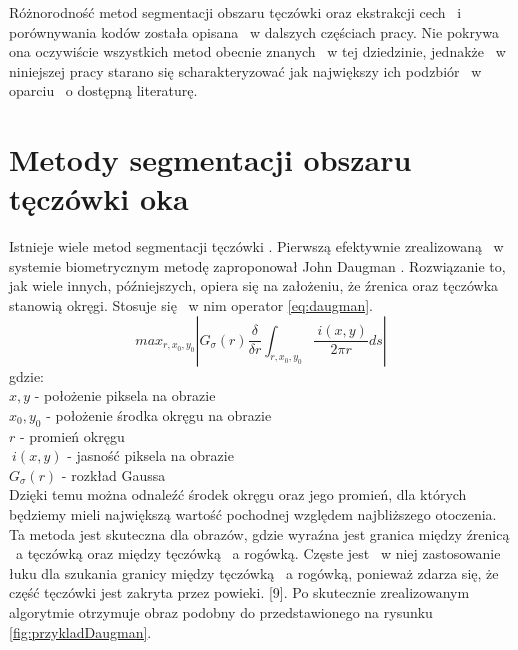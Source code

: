Różnorodność metod segmentacji obszaru tęczówki oraz ekstrakcji cech ~i porównywania kodów została opisana ~w dalszych częściach pracy. Nie pokrywa ona oczywiście wszystkich metod obecnie znanych ~w tej dziedzinie, jednakże ~w niniejszej pracy starano się scharakteryzować jak największy ich podzbiór ~w oparciu ~o dostępną literaturę.


\section{Metody segmentacji obszaru tęczówki oka}
\label{sec:segmentacja}

Istnieje wiele metod segmentacji tęczówki \cite{PrAl06}. Pierwszą efektywnie zrealizowaną ~w systemie biometrycznym metodę zaproponował John Daugman \cite{Daugman}. Rozwiązanie to, jak wiele innych, późniejszych, opiera się na założeniu, że źrenica oraz tęczówka stanowią okręgi. Stosuje się ~w nim operator \ref{eq:daugman}.
\begin{equation}
\label{eq:daugman}
max_{r,x_{0},y_{0}}\left| G_{\sigma}(r) \frac{\delta}{\delta r}\int_{r,x_{0},y_{0}} \frac{~i(x,y)}{2\pi r}ds \right|
\end{equation}
gdzie:\\
$ x,y $ - położenie piksela na obrazie \\
$ x_{0}, y_{0} $ - położenie środka okręgu na obrazie \\
$ r $ - promień okręgu \\
$ ~i(x,y) $ - jasność piksela na obrazie\\
$ G_{\sigma}(r) $ - rozkład Gaussa\\

Dzięki temu można odnaleźć środek okręgu oraz jego promień, dla których będziemy mieli największą wartość pochodnej względem najbliższego otoczenia. Ta metoda jest skuteczna dla obrazów, gdzie wyraźna jest granica między źrenicą ~a tęczówką oraz między tęczówką ~a rogówką. Częste jest ~w niej zastosowanie łuku dla szukania granicy między tęczówką ~a rogówką, ponieważ zdarza się, że część tęczówki jest zakryta przez powieki. [9]. Po skutecznie zrealizowanym algorytmie otrzymuje obraz podobny do przedstawionego na rysunku \ref{fig:przykladDaugman}.

